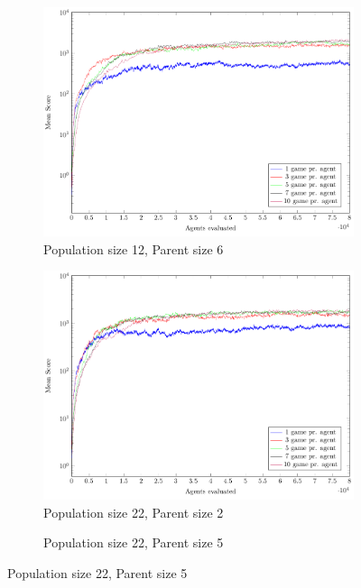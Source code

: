 \begin{figure}
\begin{subfigure}[b]{0.49\textwidth}
    	\caption{Population size 12, Parent size 6}
        \includegraphics[width=\textwidth]{data/ce_population_offspring/12x_split/constant_l12_o6/mean/PlotFile.pdf}
    \end{subfigure}
    \begin{subfigure}[b]{0.49\textwidth}
    	\caption{Population size 22, Parent size 2}
        \includegraphics[width=\textwidth]{data/ce_population_offspring/22x_split/constant_l22_o2/mean/PlotFile.pdf}
    \end{subfigure}
    \begin{subfigure}[b]{0.49\textwidth}
    	\caption{Population size 22, Parent size 5}

\end{subfigure}
\end{figure}
